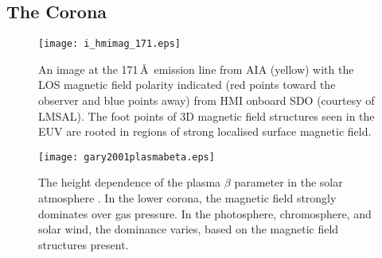 \subsection{The Corona}\label{sect:corona}

\begin{figure}[!h]
\centerline{\texttt{[image: i\_hmimag\_171.eps]}}
\caption[A image in EUV with the magnetic polarities indicated.]{An image at the 171\,\AA\ emission line from AIA (yellow) with the LOS magnetic field polarity indicated (red points toward the observer and blue points away) from HMI onboard SDO (courtesy of LMSAL). The foot points of 3D magnetic field structures seen in the EUV are rooted in regions of strong localised surface magnetic field.}
\label{fig:coronamag}
\end{figure}

\begin{figure}[!h]
\centerline{\texttt{[image: gary2001plasmabeta.eps]}}
\caption[The height dependence of the plasma $\beta$ parameter in the solar atmosphere.]{The height dependence of the plasma $\beta$ parameter in the solar atmosphere \citep[from][]{Gary:2001}. In the lower corona, the magnetic field strongly dominates over gas pressure. In the photosphere, chromosphere, and solar wind, the dominance varies, based on the magnetic field structures present.}
\label{fig:plasbeta}
\end{figure}

